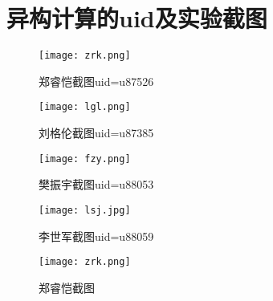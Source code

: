 \chapter{异构计算的uid及实验截图}

\begin{figure}[htbp]
\centering
\texttt{[image: zrk.png]}
\caption{郑睿恺截图uid=u87526}\label{fig:zrk}
\vspace{\baselineskip}
\end{figure}
\begin{figure}[htbp]
\centering
\texttt{[image: lgl.png]}
\caption{刘格伦截图uid=u87385}\label{fig:lgl}
\vspace{\baselineskip}
\end{figure}
\begin{figure}[htbp]
\centering
\texttt{[image: fzy.png]}
\caption{樊振宇截图uid=u88053}\label{fig:fzy}
\vspace{\baselineskip}
\end{figure}    
\begin{figure}[htbp]
\centering
\texttt{[image: lsj.jpg]}
\caption{李世军截图uid=u88059}\label{fig:lsj}
\vspace{\baselineskip}
\end{figure}
\begin{figure}[htbp]
\centering
\texttt{[image: zrk.png]}
\caption{郑睿恺截图}\label{fig:zrk}
\vspace{\baselineskip}
\end{figure}
